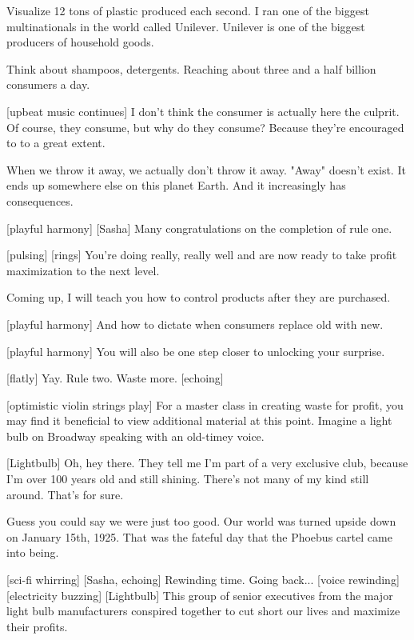 \documentclass[a4paper]{article}
\begin{document}
	
	Visualize 12 tons of plastic produced each second. I ran one of the biggest multinationals in the world called Unilever.
	Unilever is one of the biggest producers of household goods.
	
	Think about shampoos, detergents. Reaching about three and a half billion consumers a day.
	
	
	[upbeat music continues]
	I don't think the consumer is actually here the culprit.
	Of course, they consume, but why do they consume?
	Because they're encouraged to to a great extent.
	
	
	When we throw it away, we actually don't throw it away.
	"Away" doesn't exist.
	It ends up somewhere else on this planet Earth.
	And it increasingly has consequences.
	
	
	[playful harmony]
	[Sasha] Many congratulations on the completion of rule one.
	
	
	
	[pulsing]
	[rings]
	You're doing really, really well and are now ready to take profit maximization to the next level.
	
	
	Coming up, I will teach you how to control products after they are purchased.
	
	
	[playful harmony]
	And how to dictate when consumers replace old with new.
	
	
	[playful harmony]
	You will also be one step closer to unlocking your surprise.
	
	
	
	[flatly] Yay.
	Rule two.
	Waste more. [echoing]
	
	
	[optimistic violin strings play]
	For a master class in creating waste for profit, you may find it beneficial to view additional material at this point.
	Imagine a light bulb on Broadway speaking with an old-timey voice.
	
	
	[Lightbulb] Oh, hey there.
	They tell me I'm part of a very exclusive club, because I'm over 100 years old and still shining.
	There's not many of my kind still around. That's for sure.
	
	
	Guess you could say we were just too good.
	Our world was turned upside down on January 15th, 1925.
	That was the fateful day that the Phoebus cartel came into being.
	
	
	[sci-fi whirring]
	[Sasha, echoing] Rewinding time.
	Going back...
	[voice rewinding]
	[electricity buzzing]
	[Lightbulb] This group of senior executives from the major light bulb manufacturers conspired together to cut short our lives and maximize their profits.
	
\end{document}
